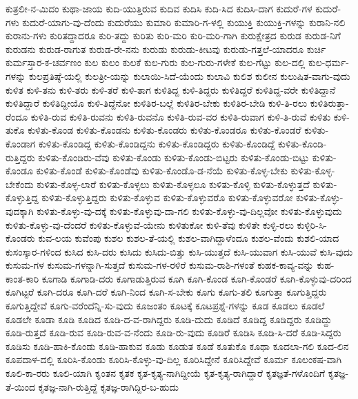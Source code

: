 ಕುತ್ರಲೀ-ನ-ಮಿದಂ
ಕುಥಾ-ಜಾಯ
ಕುದಿ-ಯುತ್ತಿರುವ
ಕುದಿವ
ಕುದಿಸಿ
ಕುದಿ-ಸಿದ
ಕುದಿಸಿ-ದಾಗ
ಕುದುರೆ-ಗಳ
ಕುದುರೆ-ಗಳು
ಕುದುರೆ-ಯಾಗು-ವು-ದೆಂದು
ಕುದುರೆಯು
ಕುಮಾರಿ
ಕುಮಾರಿ-ಗ-ಳಲ್ಲಿ
ಕುಯುಕ್ತಿ
ಕುಯುಕ್ತಿ-ಗಳನ್ನು
ಕುರಾನಿ-ನಲಿ
ಕುರಾನು-ಗಳು
ಕುರಿತದ್ದಾದರೂ
ಕುರಿ-ತದ್ದು
ಕುರಿತು
ಕುರಿ-ಮರಿ
ಕುರಿ-ಮರಿ-ಗಾಗಿ
ಕುರುಕ್ಷೇತ್ರದ
ಕುರುಡ
ಕುರುಡ-ನಿಗೆ
ಕುರುಡನು
ಕುರುಡ-ರಾಗುತ
ಕುರುಡ-ರೇ-ನನು
ಕುರುಡು
ಕುರುಡು-ಕೀಟವು
ಕುರುಡು-ಗತ್ತಲೆ-ಯಾದರೂ
ಕುರ್ಚಿ
ಕುರ್ಮಸ್ತಾರ-ಕ-ಚರ್ವಣಂ
ಕುಲ
ಕುಲಂ
ಕುಲಕೆ
ಕುಲ-ಗುರು
ಕುಲ-ಗುರು-ಗಳೇಕೆ
ಕುಲ-ಗೆಟ್ಟು
ಕುಲ-ದಲ್ಲಿ
ಕುಲ-ಧರ್ಮ-ಗಳನ್ನು
ಕುಲಪ್ರತಿಷ್ಠೆ-ಯಲ್ಲಿ
ಕುಲತ್ರೀ-ಯನ್ನು
ಕುಲಾಯಿ-ಸಿದೆ-ಯೆಂದು
ಕುಲಾವಿ
ಕುಲಿಶ
ಕುಲೀನ
ಕುಲುಷಿತ-ವಾಗು-ವುದು
ಕುಳಿತ
ಕುಳಿ-ತನು
ಕುಳಿ-ತರು
ಕುಳಿ-ತರೆ
ಕುಳಿ-ತಾಗ
ಕುಳಿತಿದ್ದ
ಕುಳಿ-ತಿದ್ದರು
ಕುಳಿತಿದ್ದರೆ
ಕುಳಿತಿದ್ದ-ವರೇ
ಕುಳಿತಿದ್ದಾನೆ
ಕುಳಿತಿದ್ದಾರೆ
ಕುಳಿತಿದ್ದೀಯೊ
ಕುಳಿ-ತಿದ್ದೆನೋ
ಕುಳಿತಿರ-ಬಲ್ಲೆ
ಕುಳಿತಿರ-ಬೇಕು
ಕುಳಿತಿರ-ಬೇಡಿ
ಕುಳಿ-ತಿ-ರಲು
ಕುಳಿತಿರುತ್ತಾ-ರೆಂದೂ
ಕುಳಿತಿ-ರುವ
ಕುಳಿತಿ-ರುವನು
ಕುಳಿತಿ-ರುವನೊ
ಕುಳಿತಿ-ರುವ-ವರ
ಕುಳಿತಿ-ರುವಾಗ
ಕುಳಿ-ತಿ-ರುವೆ
ಕುಳಿತು
ಕುಳಿ-ತುಕೊ
ಕುಳಿತು-ಕೊಂಡ
ಕುಳಿತು-ಕೊಂಡನು
ಕುಳಿತು-ಕೊಂಡರು
ಕುಳಿತು-ಕೊಂಡರೂ
ಕುಳಿತು-ಕೊಂಡರೆ
ಕುಳಿತು-ಕೊಂಡಾಗ
ಕುಳಿತು-ಕೊಂಡಿದ್ದ
ಕುಳಿತು-ಕೊಂಡಿದ್ದನು
ಕುಳಿತು-ಕೊಂಡಿದ್ದರು
ಕುಳಿತು-ಕೊಂಡಿದ್ದೆ
ಕುಳಿತು-ಕೊಂಡಿ-ರುತ್ತಿದ್ದರು
ಕುಳಿತು-ಕೊಂಡಿರು-ವೆವು
ಕುಳಿತು-ಕೊಂಡು
ಕುಳಿತು-ಕೊಂಡು-ಬಿಟ್ಟರು
ಕುಳಿತು-ಕೊಂಡು-ಬಿಟ್ಟು
ಕುಳಿತು-ಕೊಂಡೂ
ಕುಳಿತು-ಕೊಂಡೆ
ಕುಳಿತು-ಕೊಂಡೆವು
ಕುಳಿತು-ಕೊಂಡೊ-ಡ-ನೆಯೆ
ಕುಳಿತು-ಕೊಳ್ಳ-ಬೇಕು
ಕುಳಿತು-ಕೊಳ್ಳ-ಬೇಕೆಂದು
ಕುಳಿತು-ಕೊಳ್ಳ-ಲಾರೆ
ಕುಳಿತು-ಕೊಳ್ಳಲು
ಕುಳಿತು-ಕೊಳ್ಳಲೂ
ಕುಳಿತು-ಕೊಳ್ಳಿ
ಕುಳಿತು-ಕೊಳ್ಳುತ್ತದೆ
ಕುಳಿತು-ಕೊಳ್ಳುತ್ತಿದ್ದ
ಕುಳಿತು-ಕೊಳ್ಳುತ್ತಿದ್ದರು
ಕುಳಿತು-ಕೊಳ್ಳುವ
ಕುಳಿತು-ಕೊಳ್ಳುವರೊ
ಕುಳಿತು-ಕೊಳ್ಳುವರೋ
ಕುಳಿತು-ಕೊಳ್ಳು-ವುದಕ್ಕಾಗಿ
ಕುಳಿತು-ಕೊಳ್ಳು-ವು-ದಕ್ಕೆ
ಕುಳಿತು-ಕೊಳ್ಳುವು-ದಾ-ಗಲಿ
ಕುಳಿತು-ಕೊಳ್ಳು-ವು-ದಿಲ್ಲವೋ
ಕುಳಿತು-ಕೊಳ್ಳುವುದು
ಕುಳಿತು-ಕೊಳ್ಳು-ವು-ದೆಂದರೆ
ಕುಳಿತು-ಕೊಳ್ಳುವೆ-ಯೇನು
ಕುಳಿತುಕೋ
ಕುಳಿ-ತೆವು
ಕುಳಿತೇ
ಕುಳ್ಳಿ-ರಲು
ಕುಳ್ಳಿರಿ-ಸಿ-ಕೊಂಡರು
ಕುವ-ಲಯ
ಕುವೆಂಪು
ಕುಶಲ
ಕುಶಲ-ತೆ-ಯಲ್ಲಿ
ಕುಶಲ-ವಾಗಿದ್ದಾಳೆಂದೂ
ಕುಶಲ-ವೆಂದು
ಕುಶಲಿ-ಯಾದ
ಕುಸಂಸ್ಕಾರ-ಗಳಿಂದ
ಕುಸಿದ
ಕುಸಿ-ದರು
ಕುಸಿದು
ಕುಸಿದು-ಬಿತ್ತು
ಕುಸಿ-ಯುತ್ತದೆ
ಕುಸಿ-ಯುವಾಗ
ಕುಸಿ-ಯುವೆ
ಕುಸಿ-ವುದು
ಕುಸುಮ-ಗಳ
ಕುಸುಮ-ಗಳನ್ನಾಗಿ-ಸುತ್ತದೆ
ಕುಸುಮ-ಗಳ-ರಳಿರೆ
ಕುಸುಮ-ರಾಶಿ-ಗಳಂತೆ
ಕುಹಕ-ಕಾವ್ಯ-ವನ್ನು
ಕುಹ-ಕಾಂತ-ಕಾರಿ
ಕೂಗಾಡಿ
ಕೂಗಾಡಿ-ದರು
ಕೂಗಾಡುತ್ತಿರುವ
ಕೂಗಿ
ಕೂಗಿ-ಕೊಂಡ
ಕೂಗಿ-ಕೊಂಡರೆ
ಕೂಗಿ-ಕೊಳ್ಳುವು-ದರಿಂದ
ಕೂಗಿಟ್ಟರೆ
ಕೂಗಿ-ದರೂ
ಕೂಗಿ-ದರೆ
ಕೂಗಿ-ನಿಂದ
ಕೂಗಿ-ಸ-ಬೇಕು
ಕೂಗು
ಕೂಗು-ತಲಿ
ಕೂಗುತ್ತಾ
ಕೂಗುತ್ತಿದ್ದರು
ಕೂಗುತ್ತಿದ್ದೇವೆ
ಕೂಗು-ವರೆಂದೆನ್ನಿ-ಸು-ವುದು
ಕೂಜಂತಂ
ಕೂಟಕ್ಕೆ
ಕೂಟಪ್ರಶ್ನೆ-ಗಳನ್ನು
ಕೂಡ
ಕೂಡಲು
ಕೂಡಲೆ
ಕೂಡಲೇ
ಕೂಡಾ
ಕೂಡಿ
ಕೂಡಿದ
ಕೂಡಿ-ದ-ವ-ರಾಗಿದ್ದರು
ಕೂಡಿ-ದುದು
ಕೂಡಿದೆ
ಕೂಡಿದ್ದ
ಕೂಡಿದ್ದರು
ಕೂಡಿದ್ದು
ಕೂಡಿ-ರುತ್ತದೆ
ಕೂಡಿ-ರುವ
ಕೂಡಿ-ರುವ-ವ-ನೆಂದು
ಕೂಡಿ-ರು-ವುದು
ಕೂಡಿರೆ
ಕೂಡಿಸಿ
ಕೂಡಿ-ಸಿ-ದರೆ
ಕೂಡಿ-ಸಿದ್ದರು
ಕೂಡಿಸು
ಕೂಡಿ-ಹಾಕಿ-ಕೊಂಡು
ಕೂಡಿ-ಹಾಕುವ
ಕೂಡು
ಕೂಡುತ
ಕೂಡೆ
ಕೂತುಕೊ
ಕೂಥಾ
ಕೂದಲಾ-ಗಲಿ
ಕೂದ-ಲಿನ
ಕೂಪದಾಳ-ದಲ್ಲಿ
ಕೂರಿಸಿ-ಕೊಂಡು
ಕೂರಿಸಿ-ಕೊಳ್ಳು-ವು-ದಿಲ್ಲ
ಕೂರಿಸಿದ್ದೇನೆ
ಕೂರಿಸಿದ್ದೇವೆ
ಕೂರ್ಮ
ಕೂಲಂಕಷ-ವಾಗಿ
ಕೂಲಿ-ಕಾ-ರರು
ಕೂಲಿ-ಯಾಗಿ
ಕೃಂತನ
ಕೃತಕ
ಕೃತ-ಕೃತ್ಯ-ನಾಗಿದ್ದೀಯೆ
ಕೃತ-ಕೃತ್ಯ-ರಾಗಿದ್ದಾರೆ
ಕೃತಜ್ಞತೆ-ಗಳೊಂದಿಗೆ
ಕೃತಜ್ಞ-ತೆ-ಯಿಂದ
ಕೃತಜ್ಞ-ನಾಗಿ-ರುತ್ತಿದ್ದೆ
ಕೃತಜ್ಞ-ರಾಗಿದ್ದಿರ-ಬ-ಹುದು
